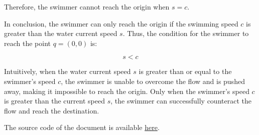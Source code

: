 \documentclass[12pt,a4paper]{article}
\begin{document}
\begin{solution}
Therefore, the swimmer cannot reach the origin when \(s = c\).

In conclusion, the swimmer can only reach the origin if the swimming speed \(c\) is greater than the water current speed \(s\). Thus, the condition for the swimmer to reach the point \(q = (0, 0)\) is:

\[
s < c
\]

Intuitively, when the water current speed \(s\) is greater than or equal to the swimmer's speed \(c\), the swimmer is unable to overcome the flow and is pushed away, making it impossible to reach the origin. Only when the swimmer's speed \(c\) is greater than the current speed \(s\), the swimmer can successfully counteract the flow and reach the destination.

\end{solution}


The source code of the document is available \href{https://www.overleaf.com/read/xfncwbffbqks#5bc191}{here}.
\end{document}
